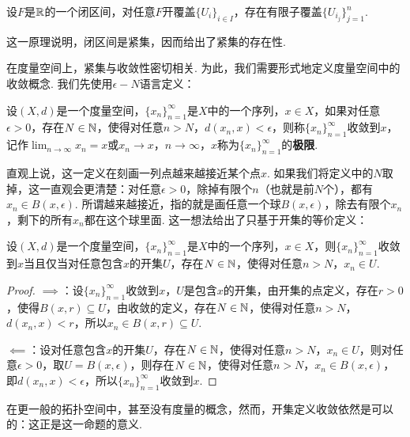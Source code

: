 \begin{proposition}\label{prop:heine-borel}
设$F$是$\mathbb{R}$的一个闭区间，对任意$F$开覆盖$\{U_i\}_{i\in I}$，存在有限子覆盖$\{U_{i_j}\}_{j=1}^n$.
\end{proposition}
这一原理说明，闭区间是紧集，因而给出了紧集的存在性. 

在度量空间上，紧集与收敛性密切相关. 为此，我们需要形式地定义度量空间中的收敛概念. 我们先使用$\epsilon-N$语言定义：

\begin{definition}[收敛，极限]
    设$(X,d)$是一个度量空间，$\{x_n\}_{n=1}^\infty$是$X$中的一个序列，$x\in X$，如果对任意$\epsilon>0$，存在$N\in\mathbb{N}$，使得对任意$n>N$，$d(x_n,x)<\epsilon$，则称$\{x_n\}_{n=1}^\infty$收敛到$x$，记作$\lim_{n\to\infty}x_n=x$或$x_n\to x$，$n\to\infty$，$x$称为$\{x_n\}_{n=1}^\infty$的\textbf{极限}. 
\end{definition}
直观上说，这一定义在刻画一列点越来越接近某个点$x$. 如果我们将定义中的$N$取掉，这一直观会更清楚：对任意$\epsilon>0$，除掉有限个$n$（也就是前$N$个），都有$x_n\in B(x,\epsilon)$. 所谓越来越接近，指的就是画任意一个球$B(x,\epsilon)$，除去有限个$x_n$，剩下的所有$x_n$都在这个球里面. 这一想法给出了只基于开集的等价定义：

\begin{proposition}\label{prop:converge-ball}
    设$(X,d)$是一个度量空间，$\{x_n\}_{n=1}^\infty$是$X$中的一个序列，$x\in X$，则$\{x_n\}_{n=1}^\infty$收敛到$x$当且仅当对任意包含$x$的开集$U$，存在$N\in\mathbb{N}$，使得对任意$n>N$，$x_n\in U$.
\end{proposition}
\begin{proof}
    $\implies$：设$\{x_n\}_{n=1}^\infty$收敛到$x$，$U$是包含$x$的开集，由开集的点定义，存在$r>0$，使得$B(x,r)\subseteq U$，由收敛的定义，存在$N\in\mathbb{N}$，使得对任意$n>N$，$d(x_n,x)<r$，所以$x_n\in B(x,r)\subseteq U$.

    $\impliedby$：设对任意包含$x$的开集$U$，存在$N\in\mathbb{N}$，使得对任意$n>N$，$x_n\in U$，则对任意$\epsilon>0$，取$U=B(x,\epsilon)$，则存在$N\in\mathbb{N}$，使得对任意$n>N$，$x_n\in B(x,\epsilon)$，即$d(x_n,x)<\epsilon$，所以$\{x_n\}_{n=1}^\infty$收敛到$x$.
\end{proof}
在更一般的拓扑空间中，甚至没有度量的概念，然而，开集定义收敛依然是可以的：这正是这一命题的意义. 

